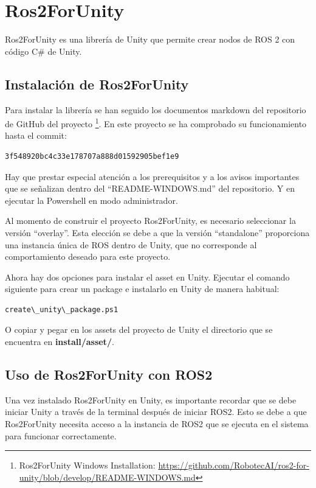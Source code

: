 \section{Ros2ForUnity}
\label{ros2forunity}

Ros2ForUnity es una librería de Unity que permite crear nodos de ROS 2 con código C\# de Unity.


\subsection{Instalación de Ros2ForUnity}
Para instalar la librería se han seguido los documentos markdown del repositorio de GitHub del proyecto \footnote{Ros2ForUnity Windows Installation: \url{https://github.com/RobotecAI/ros2-for-unity/blob/develop/README-WINDOWS.md}}. En este proyecto se ha comprobado su funcionamiento hasta el commit:

\begin{verbatim}
3f548920bc4c33e178707a888d01592905bef1e9
\end{verbatim}



Hay que prestar especial atención a los prerequisitos y a los avisos importantes que se señalizan dentro del ``README-WINDOWS.md'' del repositorio. Y en ejecutar la Powershell en modo administrador.



Al momento de construir el proyecto Ros2ForUnity, es necesario seleccionar la versión ``overlay''. Esta elección se debe a que la versión ``standalone'' proporciona una instancia única de ROS dentro de Unity, que no corresponde al comportamiento deseado para este proyecto.



Ahora hay dos opciones para instalar el asset en Unity. Ejecutar el comando siguiente para crear un package e instalarlo en Unity de manera habitual:

\begin{verbatim}
create\_unity\_package.ps1
\end{verbatim}

O copiar y pegar en los assets del proyecto de Unity el directorio que se encuentra en \textbf{install/asset/}.

\subsection{Uso de Ros2ForUnity con ROS2}

Una vez instalado Ros2ForUnity en Unity, es importante recordar que se debe iniciar Unity a través de la terminal después de iniciar ROS2. Esto se debe a que Ros2ForUnity necesita acceso a la instancia de ROS2 que se ejecuta en el sistema para funcionar correctamente.

